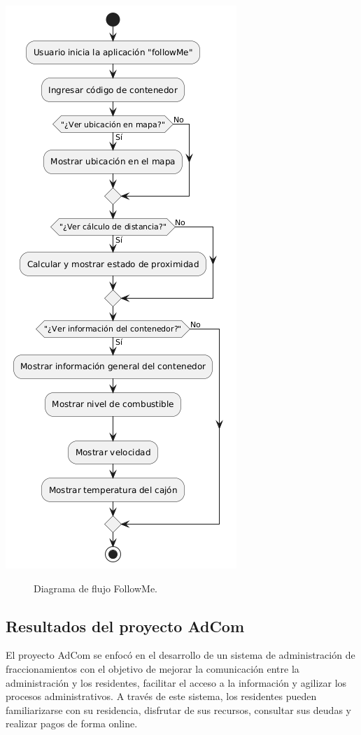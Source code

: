 \documentclass[protocolo.tex]{subfiles}
\begin{document}
\begin{center}
\includegraphics[scale=0.5]{Imagenes/followme.png}
\end{center}
\begin{figure}[h]  %
    \centering
    \caption{Diagrama de flujo FollowMe.}
    \label{fig:mi-figura4}
\end{figure}
\subsection{Resultados del proyecto AdCom}

El proyecto AdCom se enfocó en el desarrollo de un sistema de administración de fraccionamientos con el objetivo de  mejorar la comunicación entre la administración y los residentes,  facilitar el acceso a la información y agilizar los procesos administrativos.  A través de este sistema, los residentes pueden  familiarizarse con su residencia,  disfrutar de sus recursos,  consultar sus deudas y realizar pagos de forma online.\vspace{4mm}
\end{document}
